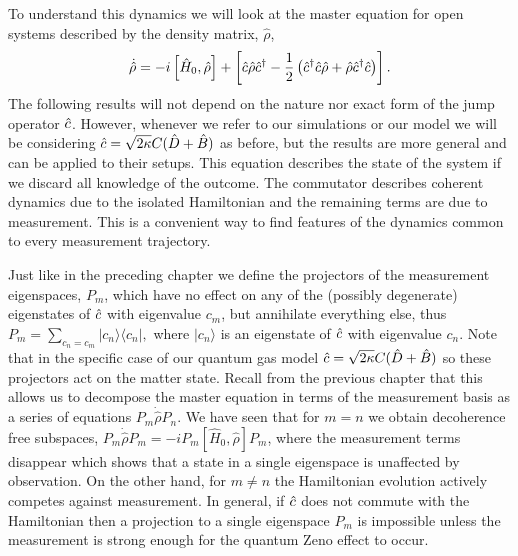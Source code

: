 To understand this dynamics we will look at the master equation for
open systems described by the density matrix, $\hat{\rho}$,
\begin{equation}
  \dot{\hat{\rho}} = -i \left[\hat{H}_0, \hat{\rho} \right] + 
  \left[ \hat{c} \hat{\rho} \hat{c}^\dagger - \frac{1}{2} \left( \hat{c}^\dagger \hat{c} \hat{\rho} + \hat{\rho}
      \hat{c}^\dagger \hat{c} \right) \right].
\end{equation}
The following results will not depend on the nature nor exact form of
the jump operator $\hat{c}$. However, whenever we refer to our simulations
or our model we will be considering $\hat{c} = \sqrt{2 \kappa} C(\hat{D} + \hat{B})$
as before, but the results are more general and can be applied to their
setups. This equation describes the state of the system if we discard
all knowledge of the outcome. The commutator describes coherent
dynamics due to the isolated Hamiltonian and the remaining terms are
due to measurement. This is a convenient way to find features of the
dynamics common to every measurement trajectory.

Just like in the preceding chapter we define the projectors of the
measurement eigenspaces, $P_m$, which have no effect on any of the
(possibly degenerate) eigenstates of $\hat{c}$ with eigenvalue $c_m$, but
annihilate everything else, thus
$P_m = \sum_{c_n = c_m} | c_n \rangle \langle c_n |,$ where
$| c_n \rangle$ is an eigenstate of $\hat{c}$ with eigenvalue $c_n$. Note
that in the specific case of our quantum gas model
$\hat{c} = \sqrt{2 \kappa} C(\hat{D} + \hat{B})$ so these projectors act on the
matter state. Recall from the previous chapter that this allows us to
decompose the master equation in terms of the measurement basis as a
series of equations $P_m \dot{\hat{\rho}} P_n$. We have seen that for
$m = n$ we obtain decoherence free subspaces,
$P_m \dot{\hat{\rho}} P_m = -i P_m \left[\hat{H}_0, \hat{\rho} \right]
P_m$, where the measurement terms disappear which shows that a state
in a single eigenspace is unaffected by observation. On the other
hand, for $m \ne n$ the Hamiltonian evolution actively competes
against measurement. In general, if $\hat{c}$ does not commute with the
Hamiltonian then a projection to a single eigenspace $P_m$ is
impossible unless the measurement is strong enough for the quantum
Zeno effect to occur.

